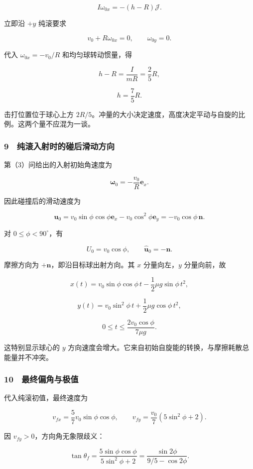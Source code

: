 \documentclass[12pt,a4paper,fontset=fandol]{ctexart}
\begin{document}
\[I\omega_{0x}=-(h-R)\mathcal J.\]

立即沿 \(+y\) 纯滚要求

\[v_0+R\omega_{0x}=0,
\qquad\omega_{0y}=0.\]

代入 \(\omega_{0x}=-v_0/R\) 和均匀球转动惯量，得

\[h-R=\frac I{mR}=\frac25R,\]

\[\boxed{h=\frac75R.}\]

击打位置位于球心上方
\(2R/5\)。冲量的大小决定速度，高度决定平动与自旋的比例。这两个量不应混为一谈。

\subsubsection{9　纯滚入射时的碰后滑动方向}\label{ux7eafux6edaux5165ux5c04ux65f6ux7684ux78b0ux540eux6ed1ux52a8ux65b9ux5411}

第（3）问给出的入射初始角速度为

\[\boldsymbol\omega_0=-\frac{v_0}{R}\boldsymbol e_x.\]

因此碰撞后的滑动速度为

\[\boldsymbol u_0
=v_0\sin\phi\cos\phi\boldsymbol e_x
-v_0\cos^2\phi\boldsymbol e_y
=-v_0\cos\phi\,\boldsymbol n.\]

对 \(0\le\phi<90^\circ\)，有

\[U_0=v_0\cos\phi,
\qquad\widehat{\boldsymbol u}_0=-\boldsymbol n.\]

摩擦方向为 \(+\boldsymbol n\)，即沿目标球出射方向。其 \(x\)
分量向左，\(y\) 分量向前，故

\[\boxed{x(t)=v_0\sin\phi\cos\phi\,t
-\frac12\mu g\sin\phi\,t^2,}\]

\[\boxed{y(t)=v_0\sin^2\phi\,t
+\frac12\mu g\cos\phi\,t^2,}\]

\[0\le t\le\frac{2v_0\cos\phi}{7\mu g}.\]

这特别显示球心的 \(y\)
方向速度会增大。它来自初始自旋能的转换，与摩擦耗散总能量并不冲突。

\subsubsection{10　最终偏角与极值}\label{ux6700ux7ec8ux504fux89d2ux4e0eux6781ux503c}

代入纯滚初值，最终速度为

\[v_{fx}=\frac57v_0\sin\phi\cos\phi,
\qquad v_{fy}=\frac{v_0}{7}(5\sin^2\phi+2).\]

因 \(v_{fy}>0\)，方向角无象限歧义：

\[\boxed{\tan\theta_f
=\frac{5\sin\phi\cos\phi}{5\sin^2\phi+2}
=\frac{\sin2\phi}{9/5-\cos2\phi}.}\]
\end{document}
